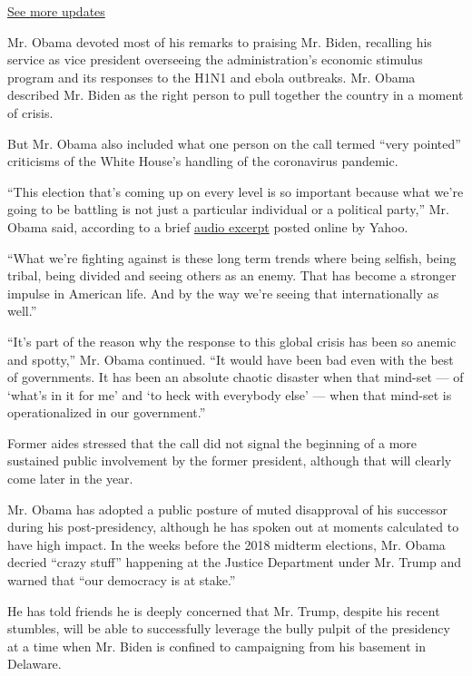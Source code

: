 \href{https://www.nytimes.com/2020/07/31/us/elections/biden-vs-trump.html?action=click\&pgtype=Article\&state=default\&region=MAIN_CONTENT_1\&context=storylines_live_updates}{See
more updates}

Mr. Obama devoted most of his remarks to praising Mr. Biden, recalling
his service as vice president overseeing the administration's economic
stimulus program and its responses to the H1N1 and ebola outbreaks. Mr.
Obama described Mr. Biden as the right person to pull together the
country in a moment of crisis.

But Mr. Obama also included what one person on the call termed ``very
pointed'' criticisms of the White House's handling of the coronavirus
pandemic.

``This election that's coming up on every level is so important because
what we're going to be battling is not just a particular individual or a
political party,'' Mr. Obama said, according to a brief
\href{https://sports.yahoo.com/obama-irule-of-law-michael-flynn-case-014121045.html}{audio
excerpt} posted online by Yahoo.

``What we're fighting against is these long term trends where being
selfish, being tribal, being divided and seeing others as an enemy. That
has become a stronger impulse in American life. And by the way we're
seeing that internationally as well.''

``It's part of the reason why the response to this global crisis has
been so anemic and spotty,'' Mr. Obama continued. ``It would have been
bad even with the best of governments. It has been an absolute chaotic
disaster when that mind-set --- of `what's in it for me' and `to heck
with everybody else' --- when that mind-set is operationalized in our
government.''

Former aides stressed that the call did not signal the beginning of a
more sustained public involvement by the former president, although that
will clearly come later in the year.

Mr. Obama has adopted a public posture of muted disapproval of his
successor during his post-presidency, although he has spoken out at
moments calculated to have high impact. In the weeks before the 2018
midterm elections, Mr. Obama decried ``crazy stuff'' happening at the
Justice Department under Mr. Trump and warned that ``our democracy is at
stake.''

He has told friends he is deeply concerned that Mr. Trump, despite his
recent stumbles, will be able to successfully leverage the bully pulpit
of the presidency at a time when Mr. Biden is confined to campaigning
from his basement in Delaware.

